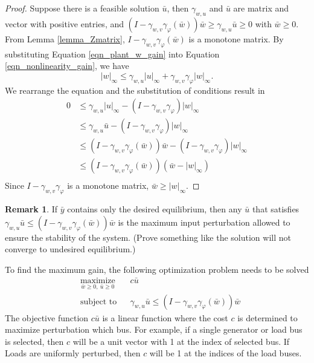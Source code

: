 \documentclass[journal]{IEEEtran}
\theoremstyle{definition}
\newtheorem*{remark}{Remark}
\begin{document}
\begin{proof}
Suppose there is a feasible solution $\bar{u}$, then $\gamma_{w,u}$ and $\bar{u}$ are matrix and vector with positive entries, and 
$(I-\gamma_{w,v}\gamma_\varphi(\bar{w}))\bar{w}\geq\gamma_{w,u}\bar{u}\geq0$ with $\bar{w}\geq0$. From Lemma \ref{lemma_Zmatrix}, $I-\gamma_{w,v}\gamma_\varphi(\bar{w})$ is a monotone matrix.
By substituting Equation \ref{eqn_plant_w_gain} into Equation \ref{eqn_nonlinearity_gain}, we have
$$|w|_\infty\leq\gamma_{w,u} |u|_\infty+\gamma_{w,v}\gamma_\varphi |w|_\infty.$$
We rearrange the equation and the substitution of conditions result in
$$\begin{aligned} 
0&\leq\gamma_{w,u} |u|_\infty-(I-\gamma_{w,v}\gamma_\varphi)|w|_\infty \\ 
&\leq\gamma_{w,u} \bar{u}-(I-\gamma_{w,v}\gamma_\varphi)|w|_\infty \\ 
&\leq(I-\gamma_{w,v}\gamma_\varphi(\bar{w}))\bar{w}-(I-\gamma_{w,v}\gamma_\varphi)|w|_\infty \\ 
&\leq(I-\gamma_{w,v}\gamma_\varphi(\bar{w}))(\bar{w}-|w|_\infty) \\ 
\end{aligned}$$
Since $I-\gamma_{w,v}\gamma_\varphi$ is a monotone matrix, $\bar{w}\geq|w|_\infty$.
\end{proof}

\begin{remark}
If $\bar{y}$ contains only the desired equilibrium, then any $\bar{u}$ that satisfies $\gamma_{w,u}\bar{u}\leq(I-\gamma_{w,v}\gamma_\varphi(\bar{w}))\bar{w}$ is the maximum input perturbation allowed to ensure the stability of the system. (Prove something like the solution will not converge to undesired equilibrium.)
\end{remark}

To find the maximum gain, the following optimization problem needs to be solved 
\begin{equation}
\begin{aligned}
& \underset{\bar{w}\geq 0,\ \bar{u}\geq 0}{\text{maximize}} & & c\bar{u} \\
& \text{subject to} & & \gamma_{w,u}\bar{u}\leq(I-\gamma_{w,v}\gamma_\varphi(\bar{w}))\bar{w}
\end{aligned}
\label{eqn_opt}
\end{equation}
The objective function $c\bar{u}$ is a linear function where the cost $c$ is determined to maximize perturbation which bus. For example, if a single generator or load bus is selected, then $c$ will be a unit vector with 1 at the index of selected bus. If Loads are uniformly perturbed, then $c$ will be 1 at the indices of the load buses.
\end{document}
